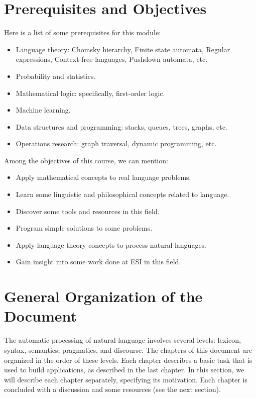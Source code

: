\documentclass{KodeBook}
\begin{document}
\section*{Prerequisites and Objectives}

Here is a list of some prerequisites for this module:
\begin{itemize}
\item Language theory: Chomsky hierarchy, Finite state automata, Regular expressions, Context-free languages, Pushdown automata, etc.
\item Probability and statistics.
\item Mathematical logic: specifically, first-order logic.
\item Machine learning.
\item Data structures and programming: stacks, queues, trees, graphs, etc.
\item Operations research: graph traversal, dynamic programming, etc.
\end{itemize}

Among the objectives of this course, we can mention:
\begin{itemize}
\item Apply mathematical concepts to real language problems.
\item Learn some linguistic and philosophical concepts related to language.
\item Discover some tools and resources in this field.
\item Program simple solutions to some problems.
\item Apply language theory concepts to process natural languages.
\item Gain insight into some work done at ESI in this field.
\end{itemize}

\section*{General Organization of the Document}

The automatic processing of natural language involves several levels: lexicon, syntax, semantics, pragmatics, and discourse.
The chapters of this document are organized in the order of these levels.
Each chapter describes a basic task that is used to build applications, as described in the last chapter.
In this section, we will describe each chapter separately, specifying its motivation.
Each chapter is concluded with a discussion and some resources (see the next section).
\end{document}

